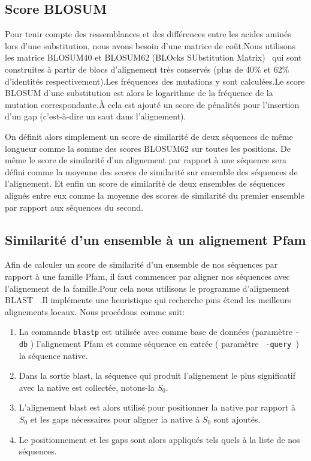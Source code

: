 \subsection{Score BLOSUM}

Pour tenir compte des ressemblances et des différences entre les acides aminés lors d'une substitution, nous avons besoin d'une matrice de coût.Nous utilisons les matrice BLOSUM40 et BLOSUM62 (BLOcks SUbstitution Matrix)~\citep{refBLOSUM} qui sont construites à partir de blocs d'alignement très conservés (plus de 40\% et 62\% d'identités respectivement).Les fréquences des mutations y sont calculées.Le score BLOSUM d'une substitution est alors le logarithme de la fréquence de la mutation correspondante.À cela est ajouté un score de pénalités pour l'insertion d'un gap (c'est-à-dire un saut dans l'alignement).

On définit alors simplement un score de similarité de deux séquences de même longueur comme la somme des scores BLOSUM62 sur toutes les positions. De même le score de similarité d'un alignement par rapport à une séquence sera défini comme la moyenne des scores de similarité sur ensemble des séquences de l'alignement. Et enfin un score de similarité de deux ensembles de séquences alignés entre eux comme la moyenne des scores de similarité du premier ensemble par rapport aux séquences du second.  

\subsection{Similarité d'un ensemble à un alignement Pfam}
\label{SimPfam}
Afin de calculer un score de similarité d'un ensemble de nos séquences par rapport à une famille Pfam, il faut commencer par aligner nos séquences avec l'alignement de la famille.Pour cela nous utilisons le programme d'alignement BLAST ~\citep{refBLAST}.Il implémente une heuristique qui recherche puis étend les meilleurs alignements locaux. Nous procédons comme suit:
\begin{enumerate}
\item La commande \verb!blastp! est utilisée avec comme base de données (paramètre \verb!-db! ) l'alignement Pfam et comme séquence en entrée ( paramètre \verb! -query !) la séquence native. 
\item Dans la sortie blast, la séquence qui produit l'alignement le plus significatif avec la native est collectée, notons-la $S_0$. 
\item L'alignement blast est alors utilisé pour positionner la native par rapport à $S_0$ et les gaps nécessaires pour aligner la native à $S_0$ sont ajoutés.
\item Le positionnement et les gaps sont alors appliqués tels quels à la liste de nos séquences.

\end{enumerate}

